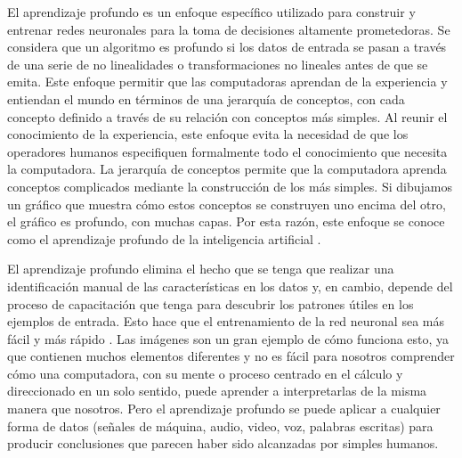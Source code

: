 	\vskip 0.4cm  
	El aprendizaje profundo es un enfoque específico utilizado para construir y entrenar redes neuronales para la toma de decisiones altamente prometedoras. Se considera que un algoritmo es profundo si los datos de entrada se pasan a través de una serie de no linealidades o transformaciones no lineales antes de que se emita. Este enfoque permitir que las computadoras aprendan de la experiencia y entiendan el mundo en términos de una jerarquía de conceptos, con cada concepto definido a través de su relación con conceptos más simples. Al reunir el conocimiento de la experiencia, este enfoque evita la necesidad de que los operadores humanos especifiquen formalmente todo el conocimiento que necesita la computadora. La jerarquía de conceptos permite que la computadora aprenda conceptos complicados mediante la construcción de los más simples. Si dibujamos un gráfico que muestra cómo estos conceptos se construyen uno encima del otro, el gráfico es profundo, con muchas capas. Por esta razón, este enfoque se conoce como el aprendizaje profundo de la inteligencia artificial \citep{Goodfellow-et-al-2016}.

	\vskip 0.4cm 
	El aprendizaje profundo elimina el hecho que se tenga que realizar una identificación manual de las características en los datos y, en cambio, depende del proceso de capacitación que tenga para descubrir los patrones útiles en los ejemplos de entrada. Esto hace que el entrenamiento de la red neuronal sea más fácil y más rápido \citep{Goodfellow-et-al-2016}. Las imágenes son un gran ejemplo de cómo funciona esto, ya que contienen muchos elementos diferentes y no es fácil para nosotros comprender cómo una computadora, con su mente o proceso centrado en el cálculo y direccionado en un solo sentido, puede aprender a interpretarlas de la misma manera que nosotros. Pero el aprendizaje profundo se puede aplicar a cualquier forma de datos (señales de máquina, audio, video, voz, palabras escritas) para producir conclusiones que parecen haber sido alcanzadas por simples humanos.

